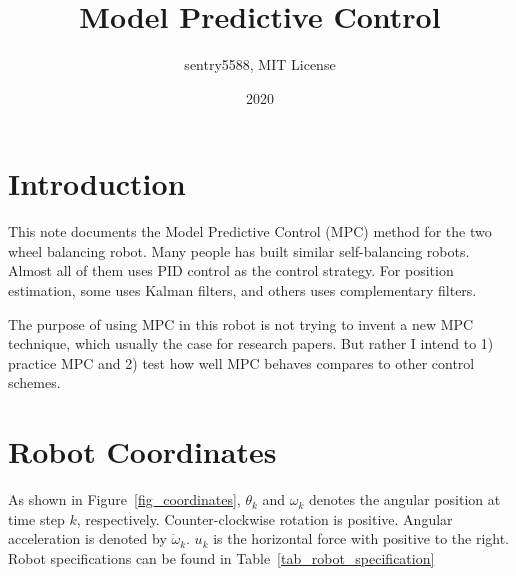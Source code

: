 \documentclass[12pt]{article}
\title{Model Predictive Control}
\date{2020}
\author{sentry5588, MIT License}
\begin{document}
\pagecolor{lightgray}
\maketitle
\section{Introduction}
This note documents the Model Predictive Control (MPC) method for the two
wheel balancing robot. Many people has built similar self-balancing robots.
Almost all of them uses PID control as the control strategy. For position
estimation, some uses Kalman filters, and others uses complementary filters.

The purpose of using MPC in this robot is not trying to invent a new MPC
technique, which usually the case for research papers.
But rather I intend to 1) practice MPC and 2) test how well MPC behaves
compares to other control schemes.

\section{Robot Coordinates}
As shown in Figure~\ref{fig_coordinates}, $\theta_k$ and $\omega_k$ denotes 
the angular position at time step $k$, respectively.
Counter-clockwise rotation is positive. Angular acceleration is denoted
by $\dot{\omega}_k$.
$u_k$ is the horizontal force
with positive to the right. Robot specifications can be found in 
Table~\ref{tab_robot_specification}
\end{document}
